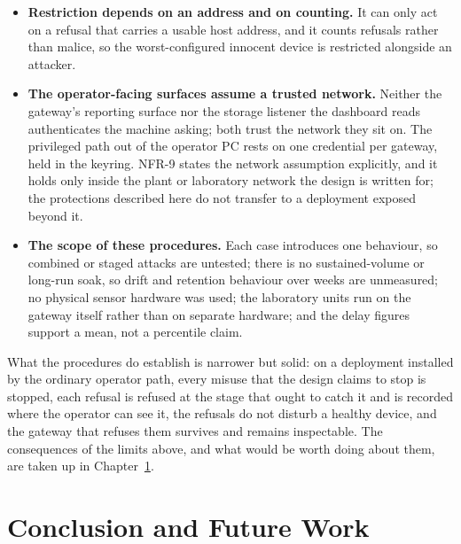 \documentclass[12pt,a4paper]{report}
\begin{document}
\begin{itemize}
    pre-shared-secret profile the daily key is derived from a
    registration secret that does not change. The gateway
    also holds each device's material in readable form. A
    later compromise of a device, or of the gateway itself,
    therefore opens traffic that was captured and stored
    earlier.
    \item \textbf{Restriction depends on an address and on
    counting.} It can only act on a refusal that carries a
    usable host address, and it counts refusals rather than
    malice, so the worst-configured innocent device is
    restricted alongside an attacker.
    \item \textbf{The operator-facing surfaces assume a
    trusted network.} Neither the gateway's reporting surface
    nor the storage listener the dashboard reads authenticates
    the machine asking; both trust the network they sit on.
    The privileged path out of the operator PC rests on one
    credential per gateway, held in the keyring. NFR-9 states
    the network assumption explicitly, and it holds only
    inside the plant or laboratory network the design is
    written for; the protections described here do not
    transfer to a deployment exposed beyond it.
    \item \textbf{The scope of these procedures.} Each case
    introduces one behaviour, so combined or staged attacks
    are untested; there is no sustained-volume or long-run
    soak, so drift and retention behaviour over weeks are
    unmeasured; no physical sensor hardware was used; the
    laboratory units run on the gateway itself rather than on
    separate hardware; and the delay figures support a mean,
    not a percentile claim.
\end{itemize}

What the procedures do establish is narrower but solid: on a
deployment installed by the ordinary operator path, every
misuse that the design claims to stop is stopped, each
refusal is refused at the stage that ought to catch it and is
recorded where the operator can see it, the refusals do not
disturb a healthy device, and the gateway that refuses them
survives and remains inspectable. The consequences of the
limits above, and what would be worth doing about them, are
taken up in Chapter~\ref{ch:conclusion}.

\chapter{Conclusion and Future Work}
\label{ch:conclusion}
\end{document}
